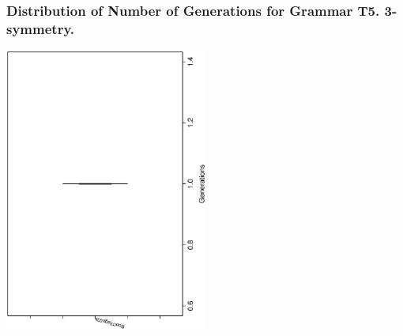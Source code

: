  \begin{frame}
 \frametitle{ Distribution of Number of Generations for Grammar T5. 3-symmetry. }
 \begin{center}
\includegraphics[width=0.5\textwidth, angle=-90]
{ExpFboxplottGenerations001.eps}
 \end{center}
 \label{ExpFboxplottGenerations001.eps}  
 \end{frame}

